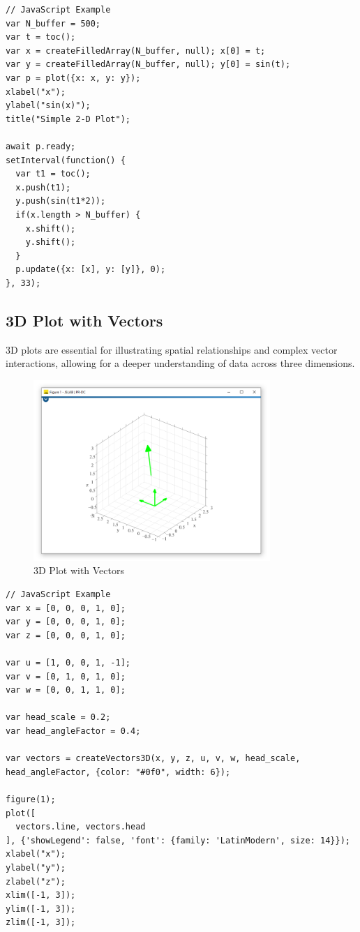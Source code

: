\documentclass[12pt,a4paper]{article}
\begin{document}
\begin{lstlisting}[style=JavaScriptStyle]
// JavaScript Example
var N_buffer = 500;
var t = toc();
var x = createFilledArray(N_buffer, null); x[0] = t;
var y = createFilledArray(N_buffer, null); y[0] = sin(t);
var p = plot({x: x, y: y});
xlabel("x");
ylabel("sin(x)");
title("Simple 2-D Plot");

await p.ready;
setInterval(function() {
  var t1 = toc();
  x.push(t1);
  y.push(sin(t1*2));
  if(x.length > N_buffer) {
    x.shift();
    y.shift();
  }
  p.update({x: [x], y: [y]}, 0);
}, 33);
\end{lstlisting}

\subsection{3D Plot with Vectors}
\label{sec:3d-plot-vectors}

3D plots are essential for illustrating spatial relationships and complex vector interactions, allowing for a deeper understanding of data across three dimensions.

\begin{figure}[H]
    \centering
    \includegraphics[width=0.8\textwidth]{resources/JSLAB_3D_plot.png}
    \caption{3D Plot with Vectors}
    \label{fig:3d-plot-vectors}
\end{figure}

\begin{lstlisting}[style=JavaScriptStyle]
// JavaScript Example
var x = [0, 0, 0, 1, 0];
var y = [0, 0, 0, 1, 0];
var z = [0, 0, 0, 1, 0];

var u = [1, 0, 0, 1, -1];
var v = [0, 1, 0, 1, 0];
var w = [0, 0, 1, 1, 0];

var head_scale = 0.2;
var head_angleFactor = 0.4;

var vectors = createVectors3D(x, y, z, u, v, w, head_scale, head_angleFactor, {color: "#0f0", width: 6});

figure(1);
plot([
  vectors.line, vectors.head
], {'showLegend': false, 'font': {family: 'LatinModern', size: 14}});
xlabel("x");
ylabel("y");
zlabel("z");
xlim([-1, 3]);
ylim([-1, 3]);
zlim([-1, 3]);
\end{lstlisting}
\end{document}
